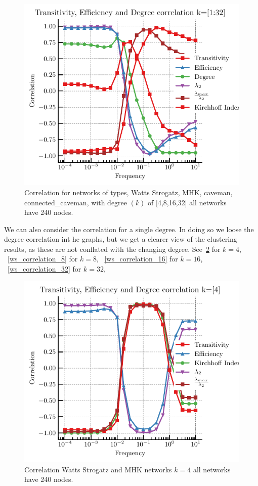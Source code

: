 \documentclass[fleqn,10pt]{wlscirep}
\begin{document}
\begin{figure}[H]                             
    \includegraphics[width=0.8\linewidth]{fig/Transitiviry_Efficiency_DEgre_correlation_1_32}
    \caption{Correlation for networks of types, Watts Strogatz, MHK, caveman, connected\_caveman, with degree $(k)$ of [4,8,16,32] all networks have 240 nodes.}
    \label{ws_correlation_less}
\end{figure}

We can  also consider the correlation for a single degree. In doing so we loose the degree correlation int he graphs, but we get a clearer view of the clustering results, as these are not conflated with the changing degree. See~\ref{ws_correlation_4} for $k=4$, ~\ref{ws_correlation_8} for $k=8$, ~\ref{ws_correlation_16} for $k=16$, ~\ref{ws_correlation_32} for $k=32$, 

\begin{figure}[H]
    \includegraphics[width=\linewidth]{fig/Transitiviry_Efficiency_DEgre_correlation_4} 
    \caption{Correlation Watts Strogatz and MHK networks $k=4$ all networks have 240 nodes.}
    \label{ws_correlation_4}
\end{figure}
\end{document}
